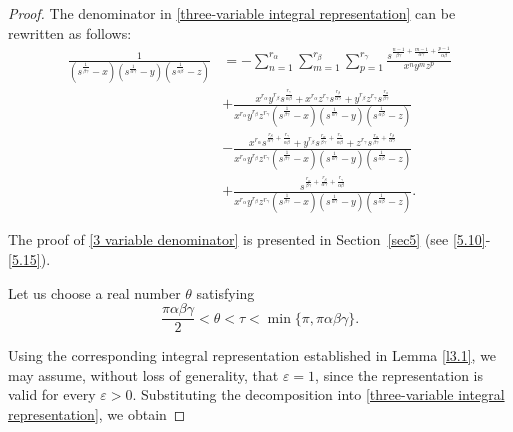 \documentclass[12pt, reqno]{amsart}
\theoremstyle{definition}
\theoremstyle{remark}
\numberwithin{equation}{section}
\begin{document}
\begin{proof} The denominator in \eqref{three-variable integral representation} can be rewritten as follows:
\begin{equation}\label{3 variable denominator}\begin{aligned}\frac{1}
{\left(s^{\frac{1}{\beta\gamma}}-x\right)
 \left(s^{\frac{1}{\alpha\gamma}}-y\right)
 \left(s^{\frac{1}{\alpha\beta}}-z\right)}&=-
\sum_{n=1}^{r_{\alpha}}
\sum_{m=1}^{r_{\beta}}
\sum_{p=1}^{r_{\gamma}}
\frac{
s^{\frac{n-1}{\beta\gamma}
+\frac{m-1}{\alpha\gamma}
+\frac{p-1}{\alpha\beta}}
}
{x^n y^m z^p}
\\&+
\frac{
x^{r_{\alpha}}y^{r_{\beta}}
s^{\frac{r_{\gamma}}{\alpha\beta}}
+x^{r_{\alpha}}z^{r_{\gamma}}
s^{\frac{r_{\beta}}{\alpha\gamma}}
+y^{r_{\beta}}z^{r_{\gamma}}
s^{\frac{r_{\alpha}}{\beta\gamma}}
}
{
x^{r_{\alpha}}
y^{r_{\beta}}
z^{r_{\gamma}}
\left(s^{\frac{1}{\beta\gamma}}-x\right)
\left(s^{\frac{1}{\alpha\gamma}}-y\right)
\left(s^{\frac{1}{\alpha\beta}}-z\right)
}
\\&-
\frac{
x^{r_{\alpha}}
s^{\frac{r_{\beta}}{\alpha\gamma}
+\frac{r_{\gamma}}{\alpha\beta}}
+y^{r_{\beta}}
s^{\frac{r_{\alpha}}{\beta\gamma}
+\frac{r_{\gamma}}{\alpha\beta}}
+z^{r_{\gamma}}
s^{\frac{r_{\alpha}}{\beta\gamma}
+\frac{r_{\beta}}{\alpha\gamma}}
}
{
x^{r_{\alpha}}
y^{r_{\beta}}
z^{r_{\gamma}}
\left(s^{\frac{1}{\beta\gamma}}-x\right)
\left(s^{\frac{1}{\alpha\gamma}}-y\right)
\left(s^{\frac{1}{\alpha\beta}}-z\right)
}
\\&+
\frac{
s^{\frac{r_{\alpha}}{\beta\gamma}
+\frac{r_{\beta}}{\alpha\gamma}
+\frac{r_{\gamma}}{\alpha\beta}}
}
{
x^{r_{\alpha}}
y^{r_{\beta}}
z^{r_{\gamma}}
\left(s^{\frac{1}{\beta\gamma}}-x\right)
\left(s^{\frac{1}{\alpha\gamma}}-y\right)
\left(s^{\frac{1}{\alpha\beta}}-z\right)
}.\end{aligned}\end{equation}

The proof of \eqref{3 variable denominator} is presented in Section~\ref{sec5} (see \eqref{5.10}-\eqref{5.15}).

Let us
choose a real number $\theta$ satisfying
\begin{equation}\label{1.5}
\frac{\pi\alpha\beta\gamma}{2}
<
\theta
<
\tau
<
\min\{\pi,\pi\alpha\beta\gamma\}.
\end{equation}

Using the corresponding integral representation established in Lemma \ref{l3.1}, we may assume, without loss of generality, that $\varepsilon=1$, since the representation is valid for every $\varepsilon>0$. Substituting the decomposition into \eqref{three-variable integral representation}, we obtain


\end{proof}
\end{document}
